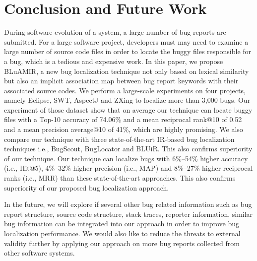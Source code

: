 \documentclass[conference]{IEEEtran}
\begin{document}
\section{Conclusion and Future Work} \label{sec:conclusionANDfuture}
During software evolution of a system, a large number of bug reports are submitted. For a large software project, developers must may need to examine a large number of source code files in order to locate the buggy files responsible for a bug, which is a tedious and expensive work. In this paper, we propose BLuAMIR, a new bug localization technique not only based on lexical similarity but also an implicit association map between bug report keywords with their associated source codes. We perform a large-scale experiments on four projects, namely Eclipse, SWT, AspectJ and ZXing to localize more than 3,000 bugs. Our experiment of those dataset show that on average our technique can locate buggy files with a Top-10 accuracy of 74.06\% and a mean reciprocal rank@10 of 0.52 and a mean precision average@10 of 41\%, which are highly promising. We also compare our technique with three state-of-the-art IR-based bug localization techniques i.e., BugScout\cite{Nguyen}, BugLocator\cite{Jian} and BLUiR\cite{Saha}.  This also confirms superiority of our technique. Our technique can localize bugs with 6\%--54\% higher accuracy (i.e., Hit@5), 4\%--32\% higher precision (i.e., MAP) and 8\%--27\% higher reciprocal ranks (i.e., MRR) than these state-of-the-art approaches. This also confirms superiority of our proposed bug localization approach. 

In the future, we will explore if several other bug related information such as bug report structure, source code structure, stack traces, reporter information, similar bug information can be integrated into our approach in order to improve bug localization performance. We would also like to reduce the threats to external validity further by applying our approach on more bug reports collected from other software systems.


\scriptsize

\end{document}
